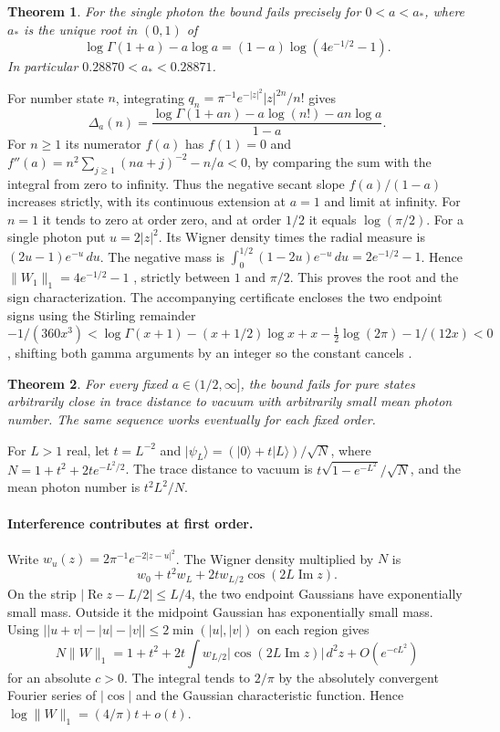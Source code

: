 \documentclass[11pt]{article}
\newtheorem{theorem}{Theorem}
\newcommand{\D}{\Delta}
\begin{document}
\begin{theorem}For the single photon the bound fails precisely for $0<a<a_*$, where $a_*$ is the unique root in $(0,1)$ of
\[
 \log\Gamma(1+a)-a\log a=(1-a)\log(4e^{-1/2}-1).
\]
In particular $0.28870<a_*<0.28871$.
\end{theorem}
For number state $n$, integrating $q_n=\pi^{-1}e^{-|z|^2}|z|^{2n}/n!$ gives
\[
 \D_a(n)=\frac{\log\Gamma(1+an)-a\log(n!)-an\log a}{1-a}.
\]
For $n\ge1$ its numerator $f(a)$ has $f(1)=0$ and
$f''(a)=n^2\sum_{j\ge1}(na+j)^{-2}-n/a<0$, by comparing the sum with the integral from zero to infinity. Thus the negative secant slope $f(a)/(1-a)$ increases strictly, with its continuous extension at $a=1$ and limit at infinity. For $n=1$ it tends to zero at order zero, and at order $1/2$ it equals $\log(\pi/2)$. For a single photon put $u=2|z|^2$. Its Wigner density times the radial measure is $(2u-1)e^{-u}\,du$. The negative mass is $\int_0^{1/2}(1-2u)e^{-u}\,du=2e^{-1/2}-1$. Hence $\|W_1\|_1=4e^{-1/2}-1$ \cite{kenfack}, strictly between $1$ and $\pi/2$. This proves the root and the sign characterization. The accompanying certificate encloses the two endpoint signs using the Stirling remainder $-1/(360x^3)<\log\Gamma(x+1)-(x+1/2)\log x+x-\tfrac12\log(2\pi)-1/(12x)<0$, shifting both gamma arguments by an integer so the constant cancels \cite{dlmf}.

\begin{theorem}For every fixed $a\in(1/2,\infty]$, the bound fails for pure states arbitrarily close in trace distance to vacuum with arbitrarily small mean photon number. The same sequence works eventually for each fixed order.
\end{theorem}
For $L>1$ real, let $t=L^{-2}$ and $|\psi_L\rangle=(|0\rangle+t|L\rangle)/\sqrt N$, where $N=1+t^2+2te^{-L^2/2}$. The trace distance to vacuum is $t\sqrt{1-e^{-L^2}}/\sqrt N$, and the mean photon number is $t^2L^2/N$.

\paragraph{Interference contributes at first order.}
Write $w_u(z)=2\pi^{-1}e^{-2|z-u|^2}$. The Wigner density multiplied by $N$ is
\[
 w_0+t^2w_L+2t w_{L/2}\cos(2L\operatorname{Im}z).
\]
On the strip $|\operatorname{Re}z-L/2|\le L/4$, the two endpoint Gaussians have exponentially small mass. Outside it the midpoint Gaussian has exponentially small mass. Using $\big||u+v|-|u|-|v|\big|\le2\min(|u|,|v|)$ on each region gives
\[
 N\|W\|_1=1+t^2+2t\int w_{L/2}|\cos(2L\operatorname{Im}z)|\,d^2z+O(e^{-cL^2})
\]
for an absolute $c>0$. The integral tends to $2/\pi$ by the absolutely convergent Fourier series of $|\cos|$ and the Gaussian characteristic function. Hence $\log\|W\|_1=(4/\pi)t+o(t)$.
\end{document}
